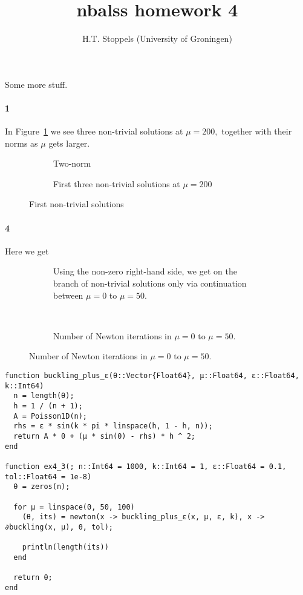 \documentclass[a4paper]{article}
\author{H.T. Stoppels (University of Groningen)}
\title{{\sc nbalss} homework 4}
\begin{document}
  \maketitle 

  \noindent Some more stuff.

  \paragraph{1} In Figure~\ref{fig:solutions} we see three non-trivial solutions at $\mu = 200,$ together with their norms as $\mu$ gets larger.


  \begin{figure}[h]
    \begin{subfigure}[b]{0.5\textwidth}
      
      \caption{Two-norm}
    \end{subfigure}
    \begin{subfigure}[b]{0.5\textwidth}
      
      \caption{First three non-trivial solutions at $\mu = 200$}
    \end{subfigure}
    \caption{First non-trivial solutions}
    \label{fig:solutions}
  \end{figure}

  \paragraph{4} Here we get

  \begin{figure}[h]
    \begin{subfigure}[t]{0.5\textwidth}
      
      \caption{Using the non-zero right-hand side, we get on the branch of non-trivial solutions only via continuation between $\mu = 0$ to $\mu = 50.$}
    \end{subfigure}~
    \begin{subfigure}[t]{0.5\textwidth}
      
      \caption{Number of Newton iterations in $\mu = 0$ to $\mu = 50.$}
    \end{subfigure}
  \end{figure}

  \begin{verbatim}
function buckling_plus_ɛ(θ::Vector{Float64}, μ::Float64, ɛ::Float64, k::Int64)
  n = length(θ);
  h = 1 / (n + 1);
  A = Poisson1D(n);
  rhs = ɛ * sin(k * pi * linspace(h, 1 - h, n));
  return A * θ + (μ * sin(θ) - rhs) * h ^ 2;
end

function ex4_3(; n::Int64 = 1000, k::Int64 = 1, ɛ::Float64 = 0.1, tol::Float64 = 1e-8)
  θ = zeros(n);

  for μ = linspace(0, 50, 100)
    (θ, its) = newton(x -> buckling_plus_ɛ(x, μ, ɛ, k), x -> ∂buckling(x, μ), θ, tol);

    println(length(its))
  end

  return θ;
end
  \end{verbatim}
\end{document}
